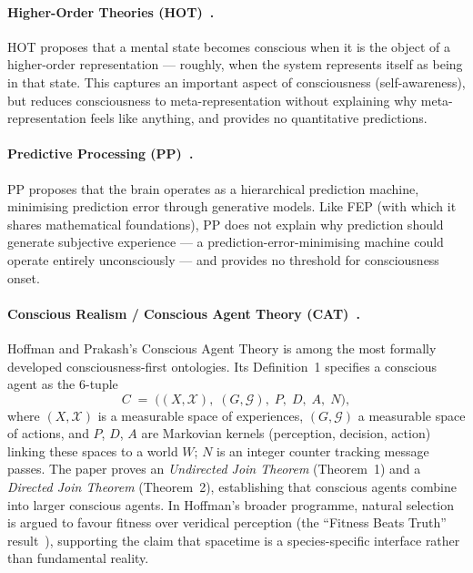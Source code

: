 \paragraph{Higher-Order Theories (HOT)~\cite{lau2011}.}
HOT proposes that a mental state becomes conscious when it is the object of a higher-order
representation --- roughly, when the system represents itself as being in that state.
This captures an important aspect of consciousness (self-awareness), but reduces consciousness
to meta-representation without explaining why meta-representation feels like anything, and
provides no quantitative predictions.

\paragraph{Predictive Processing (PP)~\cite{clark2013}.}
PP proposes that the brain operates as a hierarchical prediction machine, minimising
prediction error through generative models. Like FEP (with which it shares
mathematical foundations), PP does not explain why prediction should generate
subjective experience --- a prediction-error-minimising machine could operate
entirely unconsciously --- and provides no threshold for consciousness onset.

\paragraph{Conscious Realism / Conscious Agent Theory (CAT)~\cite{hoffman2014}.}
Hoffman and Prakash's Conscious Agent Theory is among the most formally
developed consciousness-first ontologies. Its Definition~1 specifies a
conscious agent as the 6-tuple
\[
  C \;=\; \bigl((X, \mathcal{X}),\; (G, \mathcal{G}),\; P,\; D,\; A,\; N\bigr),
\]
where $(X, \mathcal{X})$ is a measurable space of experiences,
$(G, \mathcal{G})$ a measurable space of actions, and $P$, $D$, $A$ are
Markovian kernels (perception, decision, action) linking these spaces to a
world $W$; $N$ is an integer counter tracking message passes. The paper proves
an \emph{Undirected Join Theorem} (Theorem~1) and a \emph{Directed Join
Theorem} (Theorem~2), establishing that conscious agents combine into larger
conscious agents. In Hoffman's broader programme, natural selection is argued
to favour fitness over veridical perception (the ``Fitness Beats Truth''
result~\cite{prakash2021fbt}), supporting the claim that spacetime is a
species-specific interface rather than fundamental reality.

